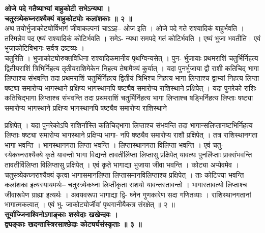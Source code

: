 \documentclass[11pt, openany]{book}
\begin{document}
{{{{\vspace{2mm}
\centering
\textbf{
 ओजे पदे गतैष्याभ्यां बाहुकोटी सभेऽन्यथा ।\\
\hspace{1cm}
 चतुस्त्र्येकघ्नराश्यैक्यं बाहुकोट्योः कलांशकाः ॥ २ ॥}\\

\vspace{2mm}
\justifying
 अथ तयोर्भुजाकोट्योर्विभागं जीवाकल्पनां चाऽऽह-- ओज इति । ओजे पदे
गते राश्यादिकं बाहुर्भवति । तस्मिन्नेव पद एष्यं राश्यादिकं कोटिर्भवति
। समेऽ-
न्यथा समपदे गतं कोटिर्भवति । एष्यं भुजा भवतीति। एवं भुजाकोटिविभागः
सर्वत्र द्रष्टव्यः ।\\
\indent
 चतुरिति । भुजाकोट्योरुक्तविधिना राश्यादिकमानीय पृथग्विन्यसेत् ।
पुन-
र्भुजायाः प्रथमराशिं चतुर्भिर्निहत्य द्वितीयराशिं त्रिभिर्निहत्य
तृतीयराशिमेकेन
निहत्य तेषामैक्यं कुर्यात् । यदा पुनर्भुजाया द्वौ राशी कतिचिद् भागा
लिप्ताश्च
संभवन्ति तदा प्रथमराशिं चतुर्भिर्निहत्य द्वितीयं त्रिभिश्च निहत्य भागा
लिप्ताश्च
द्वाभ्यां निहत्य लिप्ता षष्ट्या समारोप्य भागस्थाने प्रक्षिप्य भागस्थानपि
षष्ट्यैव
समारोप्य राशिस्थाने प्रक्षिपेत् । यदा पुनरेको राशिः कतिचिद्भागा
लिप्ताश्च संभवन्ति
तदा प्रथमराशिं चतुर्भिर्निहत्य भागा लिप्ताश्च षड्भिर्निहत्य
लिप्ताः षष्ट्या
समारोप्य भागस्थाने प्रक्षिप्य भागस्थानपि षष्ट्यैव समारोप्य राशिस्थाने

\newpage
\thispagestyle{fancy}
\fancyhf{}
\lhead{[स्फुटगत्यधिकारः]}
\justifying
\noindent
प्रक्षिपेत् । यदा पुनरेकोऽपि राशिर्नास्ति कतिचिद्भागा लिप्ताश्च
संभवन्ति तदा
भागान्सलिप्तानष्टभिर्निहत्य लिप्ताः षष्ट्या समारोप्य भागस्थाने
प्रक्षिप्य भागा-
नपि षष्ठ्यैव समारोप्य राशौ प्रक्षिपेत् । तत्र राशिस्थानगता भागा
भवन्ति ।
भागस्थानगता लिप्ता भवन्ति । लिप्तास्थानगता विलिप्ता भवन्ति । एवं
चतु-
स्येकघ्नराश्यैक्ये कृते यावन्तो भागा विद्यन्ते तावतीर्लिप्ता लिप्तासु
प्रक्षिपेत्
यावत्यः पुनर्लिप्ताः प्राक्संभवन्ति तावतीर्विलिप्ता विलिप्तासु
प्रक्षिपेत् । एवं कृते
भागाद्या भुजाया जीवा भवन्ति । कोट्या अप्येवमेव ।
चतुस्त्र्येकघ्नराश्यैक्यं
कृत्वा भागासमानलिप्ता लिप्तासमानविलिप्ताश्च प्रक्षिपेत् । ताः
कोटिज्या भवन्ति
कलांशका इत्यस्यायमर्थः-- चतुस्त्र्येकघ्ना लिप्तीकृता राशयो
यावन्तस्तावन्तो ।
भागास्तावत्यो लिप्ताश्च जीवारूपेण ग्राह्या इत्यर्थः । अवयवरूपा
भागाद्या द्वि-
घ्नेन गुणकारेण सदा गणितव्याः । राशिस्थानगतानां भागात्मकत्वात् । एवं
भु-
जाकोट्योर्जीवां पृथगानीयैकत्र संरक्षेत् ॥ २ ॥\\

\centering
\textbf{
\hspace{-2cm}
 सूर्याज्जिनाश्विनोऽगाङ्काः शरवेदाः खखेन्दवः ।\\
 द्व्यङ्काः खदन्तास्त्रिरसाश्छेदाः कोट्यर्घसंस्कृताः ॥ ३ ॥}\\

}}}}
\end{document}
